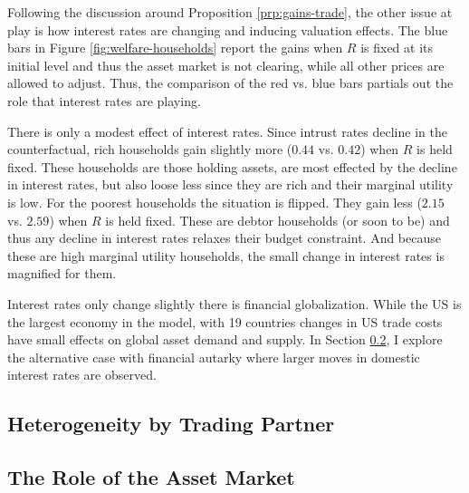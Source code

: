 \documentclass[12pt,pdftex]{article}
\begin{document}
\begin{onehalfspacing}
Following the discussion around Proposition \ref{prp:gains-trade}, the other issue at play is how interest rates are changing and inducing valuation effects. The blue bars in Figure \ref{fig:welfare-households} report the gains when $R$ is fixed at its initial level and thus the asset market is not clearing, while all other prices are allowed to adjust. Thus, the comparison of the red vs. blue bars partials out the role that interest rates are playing.

There is only a modest effect of interest rates. Since intrust rates decline in the counterfactual, rich households gain slightly more ($0.44$ vs. $0.42$) when $R$ is held fixed. These households are those holding assets, are most effected by the decline in interest rates, but also loose less since they are rich and their marginal utility is low. For the poorest households the situation is flipped. They gain less ($2.15$ vs. $2.59$) when $R$ is held fixed. These are debtor households (or soon to be) and thus any decline in interest rates relaxes their budget constraint. And because these are high marginal utility households, the small change in interest rates is magnified for them.

Interest rates only change slightly there is financial globalization. While the US is the largest economy in the model, with 19 countries changes in US trade costs have small effects on global asset demand and supply.  In Section \ref{sec:asset-market}, I explore the alternative case with financial autarky where larger moves in domestic interest rates are observed.

\subsection{Heterogeneity by Trading Partner}




\subsection{The Role of the Asset Market}\label{sec:asset-market}







\end{onehalfspacing}
\end{document}
